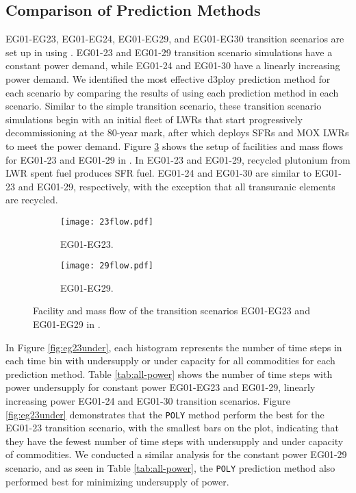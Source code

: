 \subsection{Comparison of Prediction Methods}

EG01-EG23, EG01-EG24, EG01-EG29, and EG01-EG30 transition scenarios
are set up in \Cyclus using \deploy. 
EG01-23 and EG01-29 transition scenario simulations have a constant 
power demand, while EG01-24 and EG01-30 have a linearly increasing
power demand. 
We identified the most effective d3ploy prediction method 
for each scenario by comparing the results of using each 
prediction method in each scenario. 
Similar to the simple transition scenario, these transition scenario 
simulations begin with an initial fleet of \glspl{LWR} 
that start progressively decommissioning at the 80-year mark, 
after which \deploy deploys \glspl{SFR} and \gls{MOX} \glspl{LWR} to meet 
the power demand. 
Figure \ref{fig:eg2329}
shows the setup of facilities and mass flows for 
EG01-23 and EG01-29 in \Cyclus. 
In EG01-23 and EG01-29, recycled plutonium from LWR spent fuel 
produces  \gls{SFR} fuel. 
EG01-24 and EG01-30 are similar to EG01-23 and EG01-29, respectively, 
with the exception that all transuranic elements are recycled.

\begin{figure}[]
	\centering
	\begin{subfigure}[t]{\textwidth}
		\centering
		\texttt{[image: 23flow.pdf]} 
		\caption{EG01-EG23.}
		\label{fig:23flow}
	\end{subfigure}
	\vspace{1cm}
	\begin{subfigure}[t]{\textwidth}
		\centering
		\texttt{[image: 29flow.pdf]} 
		\caption{EG01-EG29.}
		\label{fig:29flow}
	\end{subfigure}
	\hfill
	\caption{Facility and mass flow of the transition scenarios EG01-EG23 and EG01-EG29 in \Cyclus.}
	\label{fig:eg2329}
\end{figure}

In Figure \ref{fig:eg23under}, each histogram represents 
the number of time steps in each time bin with undersupply or 
under capacity for all commodities for each prediction method.  
Table \ref{tab:all-power} shows the number of time steps with power 
undersupply for constant power EG01-EG23 and EG01-29, 
linearly increasing power EG01-24 and EG01-30 transition scenarios. 
Figure \ref{fig:eg23under} demonstrates that the \texttt{POLY} method
perform the best for the EG01-23 transition scenario,
with the smallest bars on the plot, indicating that they have the 
fewest number of time steps with undersupply and under capacity
of commodities. 
We conducted a similar analysis for the constant power EG01-29 scenario,
and as seen in Table \ref{tab:all-power}, the \texttt{POLY} prediction method 
also performed best for minimizing undersupply of power.  

